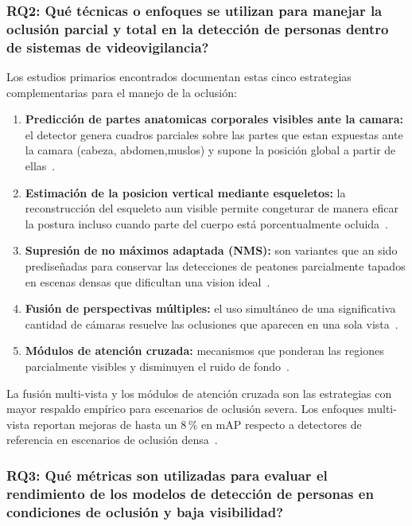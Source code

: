 \documentclass[12pt, a4paper]{article}
\begin{document}
\subsubsection{RQ2: \textquestiondown Qu\'{e} t\'{e}cnicas o enfoques
se utilizan para manejar la oclusi\'{o}n parcial y total en la
detecci\'{o}n de personas dentro de sistemas de videovigilancia?}

Los estudios primarios encontrados documentan estas cinco estrategias complementarias
para el manejo de la oclusi\'{o}n:
\begin{enumerate}
  \item \textbf{Predicci\'{o}n de partes anatomicas corporales visibles ante la camara:} el
        detector genera cuadros parciales sobre las partes que estan expuestas ante la camara
        (cabeza, abdomen,muslos) y supone la posici\'{o}n global a partir de
        ellas~\cite{E27}.
  \item \textbf{Estimaci\'{o}n de la posicion vertical mediante esqueletos:} la
        reconstrucci\'{o}n del esqueleto aun visible permite congeturar de manera eficar la postura incluso cuando parte del cuerpo
        est\'{a} porcentualmente ocluida~\cite{E27}.
  \item \textbf{Supresi\'{o}n de no m\'{a}ximos adaptada (NMS):}
        son variantes que an sido predise\~{n}adas para conservar las detecciones de peatones
        parcialmente tapados en escenas densas que dificultan una vision ideal~\cite{E29, E28, E11}.
  \item \textbf{Fusi\'{o}n de perspectivas m\'{u}ltiples:} el uso
        simult\'{a}neo de una significativa cantidad de c\'{a}maras resuelve las oclusiones que
        aparecen en una sola vista~\cite{E09, E30, E10}.
  \item \textbf{M\'{o}dulos de atenci\'{o}n cruzada:} mecanismos que
        ponderan las regiones parcialmente visibles y disminuyen el
        ruido de fondo~\cite{E31, E17, E14}.
\end{enumerate}

\begin{hallazgo}[]
  La fusi\'{o}n multi-vista y los m\'{o}dulos de atenci\'{o}n cruzada
  son las estrategias con mayor respaldo emp\'{i}rico para escenarios
  de oclusi\'{o}n severa. Los enfoques multi-vista reportan mejoras
  de hasta un 8\,\% en mAP respecto a detectores de referencia en
  escenarios de oclusi\'{o}n densa~\cite{E09, E11}.
\end{hallazgo}

\subsubsection{RQ3: \textquestiondown Qu\'{e} m\'{e}tricas son
utilizadas para evaluar el rendimiento de los modelos de detecci\'{o}n
de personas en condiciones de oclusi\'{o}n y baja visibilidad?}
\end{document}

